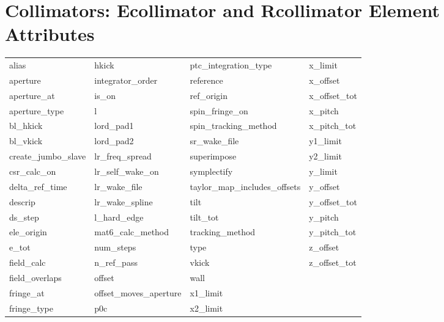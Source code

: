  \section{Collimators: Ecollimator and Rcollimator Element Attributes}
 \label{s:list.collimator}
 
 \begin{tabular}{llll} \toprule
alias                       & hkick                       & ptc_integration_type        & x_limit                     \\
aperture                    & integrator_order            & reference                   & x_offset                    \\
aperture_at                 & is_on                       & ref_origin                  & x_offset_tot                \\
aperture_type               & l                           & spin_fringe_on              & x_pitch                     \\
bl_hkick                    & lord_pad1                   & spin_tracking_method        & x_pitch_tot                 \\
bl_vkick                    & lord_pad2                   & sr_wake_file                & y1_limit                    \\
create_jumbo_slave          & lr_freq_spread              & superimpose                 & y2_limit                    \\
csr_calc_on                 & lr_self_wake_on             & symplectify                 & y_limit                     \\
delta_ref_time              & lr_wake_file                & taylor_map_includes_offsets & y_offset                    \\
descrip                     & lr_wake_spline              & tilt                        & y_offset_tot                \\
ds_step                     & l_hard_edge                 & tilt_tot                    & y_pitch                     \\
ele_origin                  & mat6_calc_method            & tracking_method             & y_pitch_tot                 \\
e_tot                       & num_steps                   & type                        & z_offset                    \\
field_calc                  & n_ref_pass                  & vkick                       & z_offset_tot                \\
field_overlaps              & offset                      & wall                        &                             \\
fringe_at                   & offset_moves_aperture       & x1_limit                    &                             \\
fringe_type                 & p0c                         & x2_limit                    &                             \\
 \bottomrule
 \end{tabular}
 \vfill
 
